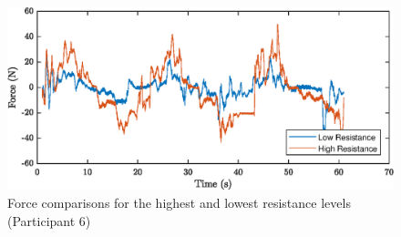 \documentclass[12pt]{report}
\begin{document}
\begin{figure}[h] 
	\centering
	\includegraphics[width=\linewidth]{force6}
	\caption{Force comparisons for the highest and lowest resistance levels (Participant 6)}
	\label{fig:force6}
\end{figure}

	
	
\end{document}
